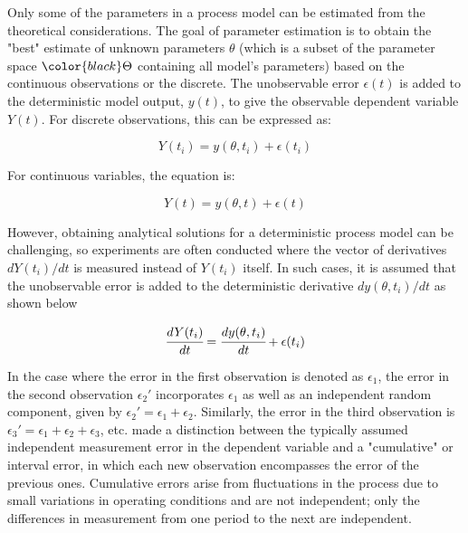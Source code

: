\documentclass[../Article_Model_Parameters.tex]{subfiles}
\begin{document}
	Only some of the parameters in a process model can be estimated from the theoretical considerations. The goal of parameter estimation is to obtain the "best" estimate of unknown parameters $\theta$ (which is a subset of the parameter space ${\color{black}\Theta}$ containing all model's parameters) based on the continuous observations or the discrete. The unobservable error $\epsilon(t)$ is added to the deterministic model output, $y(t)$, to give the observable dependent variable $Y(t)$. For discrete observations, this can be expressed as:
	
	{\footnotesize
		\begin{equation*}
			Y(t_i) = y(\theta, t_i) + \epsilon(t_i)
	\end{equation*} }
	
	For continuous variables, the equation is:
	
	{\footnotesize
		\begin{equation*}
			Y(t) = y(\theta, t) + \epsilon(t)
	\end{equation*} }
	
	However, obtaining analytical solutions for a deterministic process model can be challenging, so experiments are often conducted where the vector of derivatives $dY(t_i)/dt$ is measured instead of $Y(t_i)$ itself. In such cases, it is assumed that the unobservable error is added to the deterministic derivative $dy(\theta, t_i)/dt$ as shown below
	
	{\footnotesize
		\begin{equation}  \label{EQ: Measurment_noise}
			\cfrac{d Y(t_i)}{dt} = \cfrac{dy(\theta, t_i)}{dt} + \epsilon(t_i)
	\end{equation} }
	
	In the case where the error in the first observation is denoted as $\epsilon_1$, the error in the second observation $\epsilon_2'$ incorporates $\epsilon_1$ as well as an independent random component, given by $\epsilon_2' = \epsilon_1 + \epsilon_2$. Similarly, the error in the third observation is $\epsilon_3' = \epsilon_1 + \epsilon_2 + \epsilon_3$, etc. \citet{Mandel1957}  made a distinction between the typically assumed independent measurement error in the dependent variable and a "cumulative" or interval error, in which each new observation encompasses the error of the previous ones. Cumulative errors arise from fluctuations in the process due to small variations in operating conditions and are not independent; only the differences in measurement from one period to the next are independent.
	
\end{document}
